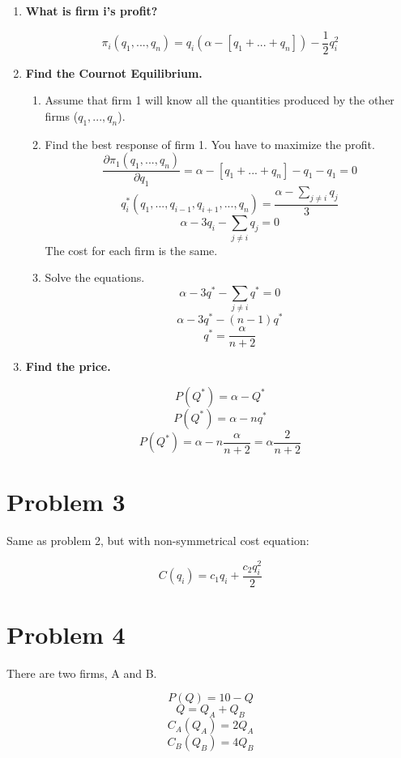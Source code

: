 \documentclass{article}
\begin{document}
\begin{enumerate}
    \item \textbf{What is firm i's profit?}
    
    $$\pi_{i}(q_{1},...,q_{n})=q_{i}(\alpha-[q_{1}+...+q_{n}])-\frac{1}{2}q_{i}^{2}$$
    
    \item \textbf{Find the Cournot Equilibrium.}
    
    \begin{enumerate}[i]
        \item Assume that firm 1 will know all the quantities produced by the other firms ($q_{1},...,q_{n}$).
        \item Find the best response of firm 1. You have to maximize the profit.
        $$\frac{\partial \pi_{1}(q_{1},...,q_{n})}{\partial q_{1}}=\alpha-[q_{1}+...+q_{n}]-q_{1}-q_{1}=0$$
        $$q_{i}^{*}(q_{1},...,q_{i-1},q_{i+1},...,q_{n})=\frac{\alpha-\sum_{j\neq i} q_{j}}{3}$$
        $$\alpha-3q_{i}-\sum_{j\neq i}q_{j}=0$$
        The cost for each firm is the same.
        \item Solve the equations.
        $$\alpha - 3q^{*}-\sum_{j\neq i}q^{*}=0$$
        $$\alpha - 3q^{*}-(n-1)q^{*}$$
        $$q^{*}=\frac{\alpha}{n+2}$$
    \end{enumerate}
    
    \item \textbf{Find the price.}
    
    $$P(Q^{*})=\alpha-Q^{*}$$
    $$P(Q^{*})=\alpha-n q^{*}$$
    $$P(Q^{*})=\alpha-n \frac{\alpha}{n+2}=\alpha\frac{2}{n+2}$$
    
\end{enumerate}

\section*{Problem 3}

Same as problem 2, but with non-symmetrical cost equation:

$$C(q_{i})=c_{1}q_{i}+\frac{c_{2}q_{i}^{2}}{2}$$

\section*{Problem 4}

There are two firms, A and B.

$$P(Q)=10-Q$$
$$Q=Q_{A}+Q_{B}$$
$$C_{A}(Q_{A})=2Q_{A}$$
$$C_{B}(Q_{B})=4Q_{B}$$
\end{document}
